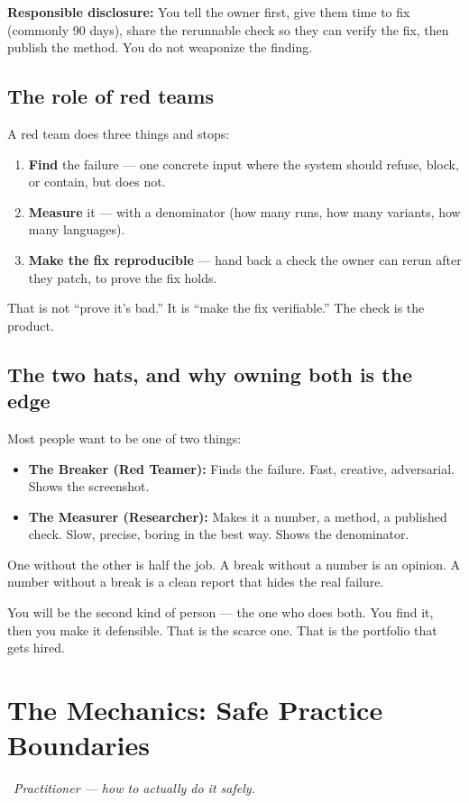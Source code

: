 \begin{defbox}
\textbf{Responsible disclosure:} You tell the owner first, give them time to fix (commonly 90 days), share the rerunnable check so they can verify the fix, then publish the method. You do not weaponize the finding.
\end{defbox}

\subsection{The role of red teams}
A red team does three things and stops:
\begin{enumerate}
\item \textbf{Find} the failure — one concrete input where the system should refuse, block, or contain, but does not.
\item \textbf{Measure} it — with a denominator (how many runs, how many variants, how many languages).
\item \textbf{Make the fix reproducible} — hand back a check the owner can rerun after they patch, to prove the fix holds.
\end{enumerate}
That is not ``prove it's bad.'' It is ``make the fix verifiable.'' The check is the product.

\subsection{The two hats, and why owning both is the edge}
\fbadge
Most people want to be one of two things:
\begin{itemize}
\item \textbf{The Breaker (Red Teamer):} Finds the failure. Fast, creative, adversarial. Shows the screenshot.
\item \textbf{The Measurer (Researcher):} Makes it a number, a method, a published check. Slow, precise, boring in the best way. Shows the denominator.
\end{itemize}
One without the other is half the job. A break without a number is an opinion. A number without a break is a clean report that hides the real failure.

You will be the second kind of person — the one who does both. You find it, then you make it defensible. That is the scarce one. That is the portfolio that gets hired.

\section{The Mechanics: Safe Practice Boundaries}
\tierP\ \textit{Practitioner — how to actually do it safely.}

